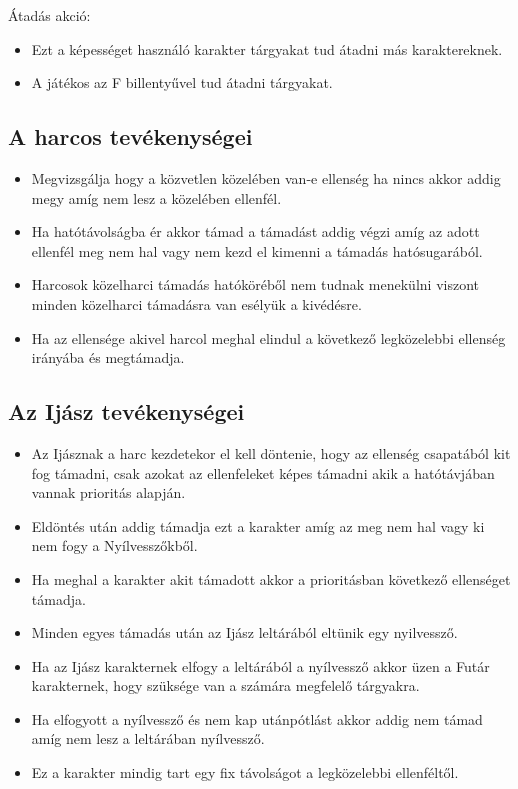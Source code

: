 Átadás akció:

\begin{itemize}
  \item Ezt a képességet használó karakter tárgyakat tud átadni más karaktereknek.
  \item A játékos az F billentyűvel tud átadni tárgyakat.
\end{itemize}

\subsection{A harcos tevékenységei}
\begin{itemize}
  \item Megvizsgálja hogy a közvetlen közelében van-e ellenség ha nincs akkor addig megy amíg nem lesz a közelében ellenfél.
  \item Ha hatótávolságba ér akkor támad a támadást addig végzi amíg az adott ellenfél meg nem hal vagy nem kezd el kimenni a támadás hatósugarából.
  \item Harcosok közelharci támadás hatóköréből nem tudnak menekülni viszont minden közelharci támadásra van esélyük a kivédésre.
  \item Ha az ellensége akivel harcol meghal elindul a következő legközelebbi ellenség irányába és megtámadja.
\end{itemize} 

\subsection{Az Ijász tevékenységei}

\begin{itemize}
  \item Az Ijásznak a harc kezdetekor el kell döntenie, hogy az ellenség csapatából kit fog támadni, csak azokat az ellenfeleket képes támadni akik a hatótávjában vannak prioritás alapján.
  \item Eldöntés után addig támadja ezt a karakter amíg az meg nem hal vagy ki nem fogy a Nyílvesszőkből.
  \item Ha meghal a karakter akit támadott akkor a prioritásban következő ellenséget támadja.
  \item Minden egyes támadás után az Ijász leltárából eltünik egy nyilvessző.
  \item Ha az Ijász karakternek elfogy a leltárából a nyílvessző akkor üzen a Futár karakternek, hogy szüksége van a számára megfelelő tárgyakra.
  \item Ha elfogyott a nyílvessző és nem kap utánpótlást akkor addig nem támad amíg nem lesz a leltárában nyílvessző.
  \item Ez a karakter mindig tart egy fix távolságot a legközelebbi ellenféltől.
\end{itemize}

